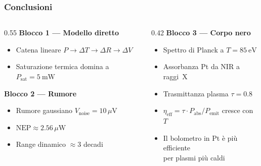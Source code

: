 \begin{frame}
\frametitle{Conclusioni}

\begin{columns}[T]
  \begin{column}{0.55\textwidth}
    \textbf{Blocco 1 --- Modello diretto}
    \begin{itemize}
      \item Catena lineare $P \to \Delta T \to \Delta R \to \Delta V$
      \item Saturazione termica domina a $P_\text{sat} = \SI{5}{\milli\watt}$
    \end{itemize}

    \vspace{0.4em}
    \textbf{Blocco 2 --- Rumore}
    \begin{itemize}
      \item Rumore gaussiano $V_\text{noise} = 10\,\mu\mathrm{V}$
      \item $\mathrm{NEP} \approx 2.56\,\mu\mathrm{W}$
      \item Range dinamico $\approx 3$ decadi
    \end{itemize}
  \end{column}
  \begin{column}{0.42\textwidth}
    \textbf{Blocco 3 --- Corpo nero}
    \begin{itemize}
      \item Spettro di Planck a $T = \SI{85}{\electronvolt}$
      \item Assorbanza Pt da NIR a raggi~X
      \item Trasmittanza plasma $\tau = 0.8$
      \item $\eta_\text{eff} = \tau \cdot P_\text{abs}/P_\text{emit}$ cresce con $T$
      \item Il bolometro in Pt \`e pi\`u efficiente\\
            per plasmi pi\`u caldi
    \end{itemize}

  \end{column}
\end{columns}

\end{frame}

